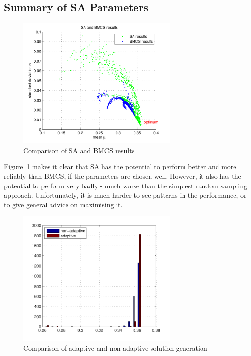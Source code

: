 \documentclass[10pt]{article}
\begin{document}
\subsection{Summary of SA Parameters}

\begin{figure}[tbp]
  \begin{center}
    \includegraphics[width=8cm]{sa_and_bmcs.pdf}
    \end{center}
    \caption{Comparison of SA and BMCS results}
    \label{fig:sa_and_bmcs}
    \end{figure}

Figure~\ref{fig:sa_and_bmcs} makes it clear that SA has the potential to
perform better and more reliably than BMCS, if the parameters are chosen well.
However, it also has the potential to perform very badly - much worse than the
simplest random sampling approach. Unfortunately, it is much harder to see
patterns in the performance, or to give general advice on maximising it.

\begin{figure}[tbp]
  \begin{center}
    \includegraphics[width=8cm]{adaptive.pdf}
    \end{center}
    \caption{Comparison of adaptive and non-adaptive solution generation}
    \label{fig:adaptive}
    \end{figure}
\end{document}
